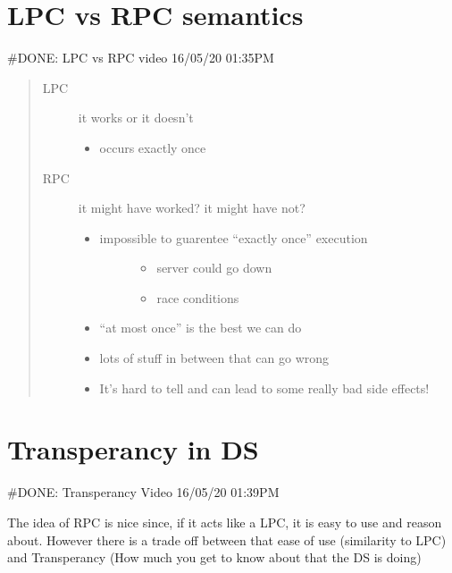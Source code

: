 \documentclass[letterpaper,10pt,english]{sphinxmanual}
\begin{document}
\section{LPC vs RPC semantics}
\label{\detokenize{week2:lpc-vs-rpc-semantics}}
\#DONE: LPC vs RPC video 16/05/20 01:35PM
\begin{quote}\begin{description}
\item[{LPC}] \leavevmode
it works or it doesn’t
\begin{itemize}
\item {} 
occurs exactly once

\end{itemize}

\item[{RPC}] \leavevmode
it might have worked? it might have not?
\begin{itemize}
\item {} \begin{description}
\item[{impossible to guarentee “exactly once” execution}] \leavevmode\begin{itemize}
\item {} 
server could go down

\item {} 
race conditions

\end{itemize}

\end{description}

\item {} 
“at most once” is the best we can do

\item {} 
lots of stuff in between that can go wrong

\item {} 
It’s hard to tell and can lead to some really bad side effects!

\end{itemize}

\end{description}\end{quote}


\section{Transperancy in DS}
\label{\detokenize{week2:transperancy-in-ds}}
\#DONE: Transperancy Video 16/05/20 01:39PM

The idea of RPC is nice since, if it acts like a LPC, it is
easy to use and reason about. However there is a trade off
between that ease of use (similarity to LPC) and Transperancy
(How much you get to know about that the DS is doing)
\end{document}
